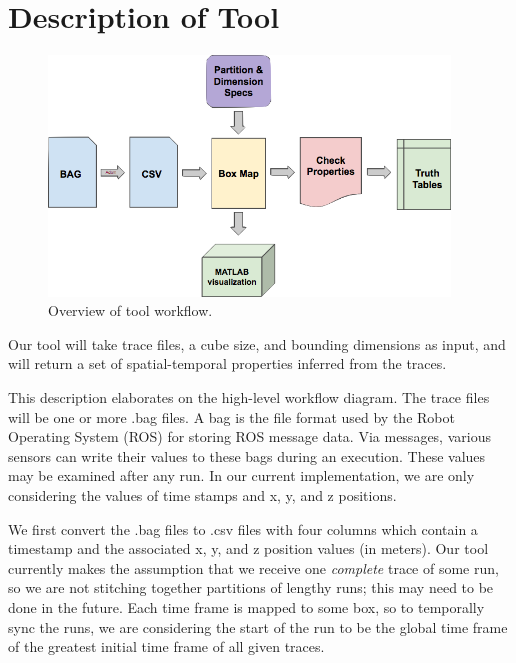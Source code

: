 \section{Description of Tool}
\label{sec:tool}

\begin{figure}[ht]
  \centering
  \includegraphics[width=0.95\textwidth]{./figures/workflow}
  \caption{Overview of tool workflow.}
  \label{fig:workflow}
\end{figure}

Our tool will take trace files, a cube size, and bounding dimensions as input, and will return a set of spatial-temporal properties inferred from the traces.  

 This description elaborates on the high-level workflow diagram.
The trace files will be one or more .bag files.  
A bag is the file format used by the Robot Operating System (ROS) for storing ROS message data.  
Via messages, various sensors can write their values to these bags during an execution. 
These values may be examined after any run.
In our current implementation, we are only considering the values of time stamps and x, y, and z positions.

We first convert the .bag files to .csv files with four columns which contain a timestamp and the associated x, y, and z position values (in meters).  
 Our tool currently makes the assumption that we receive one \emph{complete} trace of some run, so we are not stitching together partitions of lengthy runs; this may need to be done in the future.
 Each time frame is mapped to some box, so to temporally sync the runs, we are considering the start of the run to be the global time frame of the greatest initial time frame of all given traces.

